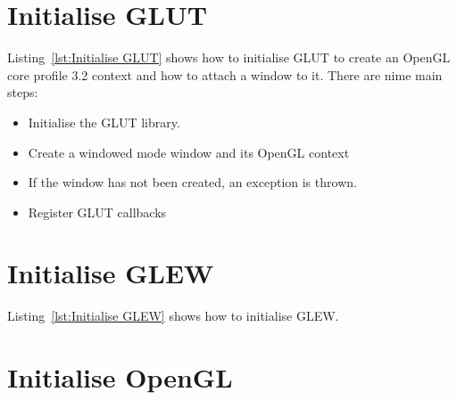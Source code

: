 \documentclass[11pt,oneside,a4paper,final]{article}
\begin{document}
\begin{center}

\end{center}


\section{Initialise GLUT}
\label{sec:Initialise GLUT}

Listing~\ref{lst:Initialise GLUT} shows how to initialise GLUT to create an 
OpenGL core profile 3.2 context and how to attach a window to it. There are 
nime main steps:
\begin{itemize}
    \item Initialise the GLUT library.
    \item Create a windowed mode window and its OpenGL context
    \item If the window has not been created, an exception is thrown.
    \item Register GLUT callbacks
\end{itemize}

\begin{center}

\end{center}


\section{Initialise GLEW}
\label{sec:Initialise GLEW}

Listing~\ref{lst:Initialise GLEW} shows how to initialise GLEW.

\begin{center}

\end{center}


\section{Initialise OpenGL}
\label{sec:Initialise OpenGL}
\end{document}
